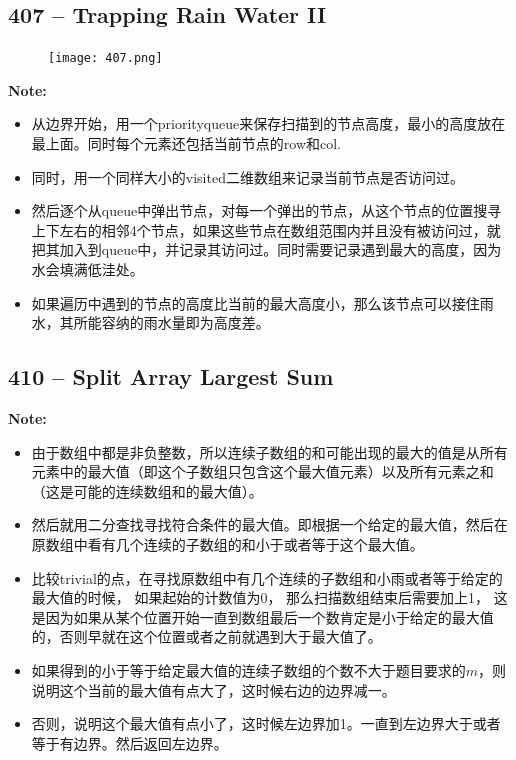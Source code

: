 \documentclass[a4paper,12pt]{article}
\begin{document}
\subsection{407 -- Trapping Rain Water II}
	\begin{figure}[H]
		\begin{center}
		\texttt{[image: 407.png]}
		\end{center}
	\end{figure}
	\textbf{\large{Note:}}
	\begin{CJK*}{UTF8}{gbsn}
	\begin{itemize}
		\item 从边界开始，用一个priority\textunderscore queue来保存扫描到的节点高度，最小的高度放在最上面。同时每个元素还包括当前节点的row和col.
		\item 同时，用一个同样大小的visited二维数组来记录当前节点是否访问过。
		\item 然后逐个从queue中弹出节点，对每一个弹出的节点，从这个节点的位置搜寻上下左右的相邻4个节点，如果这些节点在数组范围内并且没有被访问过，就把其加入到queue中，并记录其访问过。同时需要记录遇到最大的高度，因为水会填满低洼处。
		\item 如果遍历中遇到的节点的高度比当前的最大高度小，那么该节点可以接住雨水，其所能容纳的雨水量即为高度差。
	\end{itemize}
	\clearpage
	\end{CJK*}

\subsection{410 -- Split Array Largest Sum}
\textbf{\large{Note:}}
\begin{CJK*}{UTF8}{gbsn}
	\begin{itemize}
		\item 由于数组中都是非负整数，所以连续子数组的和可能出现的最大的值是从所有元素中的最大值（即这个子数组只包含这个最大值元素）以及所有元素之和（这是可能的连续数组和的最大值）。
		\item 然后就用二分查找寻找符合条件的最大值。即根据一个给定的最大值，然后在原数组中看有几个连续的子数组的和小于或者等于这个最大值。
		\item 比较trivial的点，在寻找原数组中有几个连续的子数组和小雨或者等于给定的最大值的时候， 如果起始的计数值为0， 那么扫描数组结束后需要加上1， 这是因为如果从某个位置开始一直到数组最后一个数肯定是小于给定的最大值的，否则早就在这个位置或者之前就遇到大于最大值了。
		\item 如果得到的小于等于给定最大值的连续子数组的个数不大于题目要求的$m$，则说明这个当前的最大值有点大了，这时候右边的边界减一。
		\item 否则，说明这个最大值有点小了，这时候左边界加1。一直到左边界大于或者等于有边界。然后返回左边界。
	\end{itemize}
\clearpage
\end{CJK*}
\end{document}
